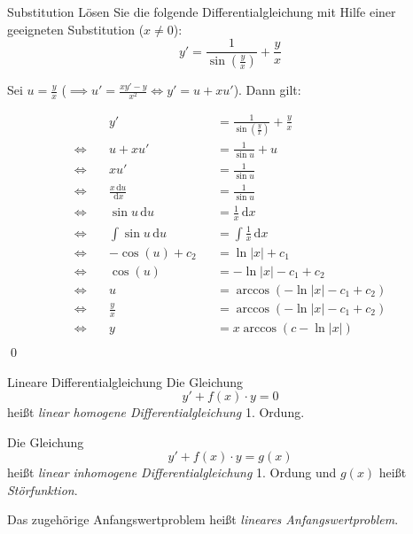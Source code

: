 \documentclass[german]{../spicker}
\renewcommand{\d}{\,\mathrm{d}}
\renewcommand{\abs}[1]{\left| #1 \right|}
\begin{document}
\begin{example}{Substitution}
    Lösen Sie die folgende Differentialgleichung mit Hilfe einer geeigneten Substitution ($x \neq 0$):
    $$
        y' = \frac{1}{\sin\left(\frac{y}{x}\right)} + \frac{y}{x}
    $$
    \noindent\makebox[\linewidth]{\rule{\textwidth}{1pt}}

    Sei $u = \frac{y}{x}$ ($\implies u' = \frac{xy' - y}{x^2} \iff y' = u + xu'$). Dann gilt:

    $$
        \begin{aligned}
                       & y'                  &  & = \frac{1}{\sin\left(\frac{y}{x}\right)} + \frac{y}{x} \\
            \iff \quad & u + xu'             &  & = \frac{1}{\sin u} + u                                 \\
            \iff \quad & xu'                 &  & = \frac{1}{\sin u}                                     \\
            \iff \quad & \frac{x \d u}{\d x} &  & = \frac{1}{\sin u}                                     \\
            \iff \quad & \sin u \d u         &  & = \frac{1}{x} \d x                                     \\
            \iff \quad & \int \sin u \d u    &  & = \int \frac{1}{x} \d x                                \\
            \iff \quad & -\cos (u) + c_2     &  & = \ln\abs{x} + c_1                                     \\
            \iff \quad & \cos (u)            &  & = -\ln\abs{x} - c_1 + c_2                              \\
            \iff \quad & u                   &  & = \arccos(-\ln\abs{x} - c_1 + c_2)                     \\
            \iff \quad & \frac{y}{x}         &  & = \arccos(-\ln\abs{x} - c_1 + c_2)                     \\
            \iff \quad & y                   &  & = x\arccos(c - \ln\abs{x})                             \\
        \end{aligned}
    $$\qed
\end{example}

\begin{defi}{Lineare Differentialgleichung}
    Die Gleichung
    $$
        y' + f(x) \cdot y = 0
    $$
    heißt \emph{linear homogene Differentialgleichung} 1. Ordung.

    Die Gleichung
    $$
        y' + f(x) \cdot y = g(x)
    $$
    heißt \emph{linear inhomogene Differentialgleichung} 1. Ordung und
    $g(x)$ heißt \emph{Störfunktion}.

    Das zugehörige Anfangswertproblem heißt \emph{lineares Anfangswertproblem}.
\end{defi}
\end{document}
